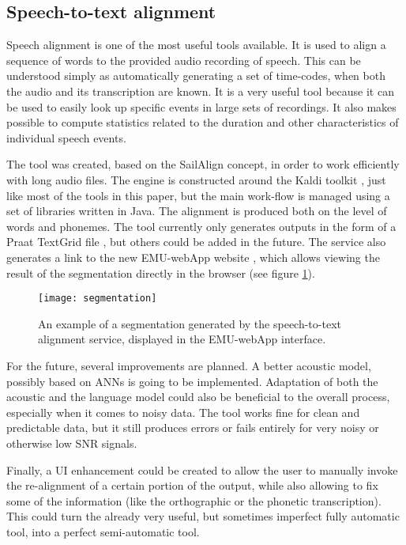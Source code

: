 \documentclass[a4paper,11pt]{article}
\begin{document}
\subsection{Speech-to-text alignment}

Speech alignment is one of the most useful tools available. It is used to align a sequence of words to the provided audio recording of speech. This can be understood simply as automatically generating a set of time-codes, when both the audio and its transcription are known. It is a very useful tool because it can be used to easily look up specific events in large sets of recordings. It also makes possible to compute statistics related to the duration and other characteristics of individual speech events.

The tool was created, based on the SailAlign \cite{katsamanis2011sailalign} concept, in order to work efficiently with long audio files. The engine is constructed around the Kaldi toolkit \cite{Povey_ASRU2011}, just like most of the tools in this paper, but the main work-flow is managed using a set of libraries written in Java. The alignment is produced both on the level of words and phonemes. The tool currently only generates outputs in the form of a Praat TextGrid file \cite{boersma2002praat}, but others could be added in the future. The service also generates a link to the new EMU-webApp website \cite{winkelmann2014introducing}, which allows viewing the result of the segmentation directly in the browser (see figure \ref{fig:emu}).

\begin{figure}
    \centering
    \texttt{[image: segmentation]}
    \caption{An example of a segmentation generated by the speech-to-text alignment service, displayed in the EMU-webApp interface.}
    \label{fig:emu}
\end{figure}

For the future, several improvements are planned. A better acoustic model, possibly based on ANNs is going to be implemented. Adaptation of both the acoustic and the language model could also be beneficial to the overall process, especially when it comes to noisy data. The tool works fine for clean and predictable data, but it still produces errors or fails entirely for very noisy or otherwise low SNR signals. 

Finally, a UI enhancement could be created to allow the user to manually invoke the re-alignment of a certain portion of the output, while also allowing to fix some of the information (like the orthographic or the phonetic transcription). This could turn the already very useful, but sometimes imperfect fully automatic tool, into a perfect semi-automatic tool.
\end{document}
